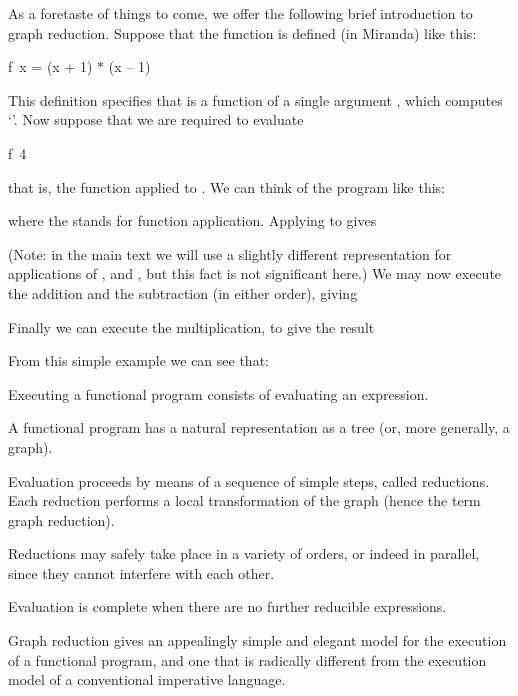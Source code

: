 As a foretaste of things to come, we offer the following brief introduction to
graph reduction. Suppose that the function  is defined (in Miranda) like this:
\begin{mlcoded}
f\, x = (x + 1) $*$ (x -- 1)
\end{mlcoded}
This definition specifies that  is a function of a single argument , which
computes `'. Now suppose that we are required to evaluate
\begin{mlcoded}
f\, 4
\end{mlcoded}
that is, the function  applied to . We can think of the program like this:
\begin{center}
\end{center}
where the  stands for function application. Applying  to  gives
\begin{center}
\end{center}
(Note: in the main text we will use a slightly different representation for
applications of \ml{$*$}, \ml{$+$} and \ml{$-$}, but this fact is not significant here.) We may now
execute the addition and the subtraction (in either order), giving
\begin{center}
\end{center}
Finally we can execute the multiplication, to give the result
\begin{center}
\end{center}

From this simple example we can see that:
\begin{numbered}
\item Executing a functional program consists of evaluating an expression.
\item A functional program has a natural representation as a tree (or, more
generally, a graph).
\item Evaluation proceeds by means of a sequence of simple steps, called
reductions. Each reduction performs a local transformation of the graph
(hence the term graph reduction).
\item Reductions may safely take place in a variety of orders, or indeed in
parallel, since they cannot interfere with each other.
\item Evaluation is complete when there are no further reducible expressions.
\end{numbered}
Graph reduction gives an appealingly simple and elegant model for the
execution of a functional program, and one that is radically different from the
execution model of a conventional imperative language.

